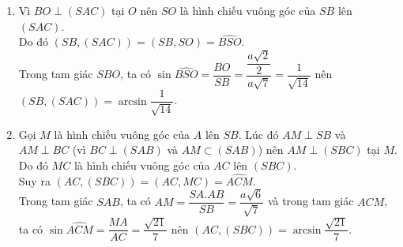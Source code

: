 \begin{vd}
{\begin{enumerate}
	Do đó $\left(SC,(SAB)\right)=(SC,SB)=\widehat{CSB}$.\\
	Trong tam giác $SCB$, ta có $\tan\widehat{CSB}=\dfrac{BC}{SB}=\dfrac{a}{a\sqrt{7}}$ nên $\left(SC,(SAB)\right)=\arctan\dfrac{1}{\sqrt{7}}$.
	\item Vì $BO\perp (SAC)$ tại $O$ nên $SO$ là hình chiếu vuông góc của $SB$ lên $(SAC)$.\\ Do đó $\left(SB,(SAC)\right)=(SB,SO)=\widehat{BSO}$.\\
	Trong tam giác $SBO$, ta có $\sin\widehat{BSO}=\dfrac{BO}{SB}=\dfrac{\dfrac{a\sqrt{2}}{2}}{a\sqrt{7}}=\dfrac{1}{\sqrt{14}}$ nên $\left(SB,(SAC)\right)=\arcsin\dfrac{1}{\sqrt{14}}$.
	\item Gọi $M$ là hình chiếu vuông góc của $A$ lên $SB$. Lúc đó $AM\perp SB$ và $AM\perp BC$ (vì $BC\perp(SAB)$ và $AM\subset (SAB)$) nên $AM\perp (SBC)$ tại $M$. Do đó $MC$ là hình chiếu vuông góc của $AC$ lên $(SBC)$.\\ 
	Suy ra $\left(AC,(SBC)\right)=(AC,MC)=\widehat{ACM}$.\\
	Trong tam giác $SAB$, ta có $AM=\dfrac{SA.AB}{SB}=\dfrac{a\sqrt{6}}{\sqrt{7}}$ và trong tam giác $ACM$, ta có $\sin\widehat{ACM}=\dfrac{MA}{AC}=\dfrac{\sqrt{21}}{7}$ nên $\left(AC,(SBC)\right)=\arcsin\dfrac{\sqrt{21}}{7}$.
	\end{enumerate}
	}
\end{vd}
